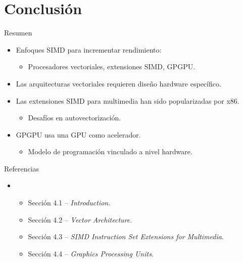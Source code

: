 \section{Conclusión}

\begin{frame}[t]{Resumen}
\begin{itemize}
  \item Enfoques SIMD para incrementar rendimiento:
    \begin{itemize}
      \item Procesadores vectoriales, extensiones SIMD, GPGPU.
    \end{itemize}

  \item Las arquitecturas vectoriales requieren diseño hardware específico.

  \item Las extensiones SIMD para multimedia han sido popularizadas por x86.
    \begin{itemize}
      \item Desafíos en autovectorización.
    \end{itemize}

  \item GPGPU usa una GPU como acelerador.
    \begin{itemize}
      \item Modelo de programación vinculado a nivel hardware.
    \end{itemize}
\end{itemize}
\end{frame}

\begin{frame}[t]{Referencias}
\begin{itemize}
  \item \bibhennessy
    \begin{itemize}
      \item Sección 4.1 -- \emph{Introduction}.
      \item Sección 4.2 -- \emph{Vector Architecture}.
      \item Sección 4.3 -- \emph{SIMD Instruction Set Extensions for Multimedia}.
      \item Sección 4.4 -- \emph{Graphics Processing Units}.
    \end{itemize}
\end{itemize}
\end{frame}


